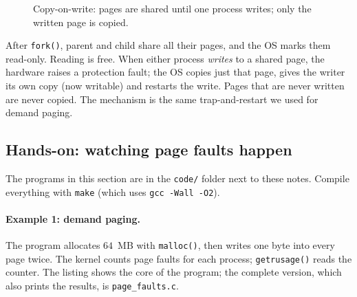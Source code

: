 \documentclass[11pt,a4paper]{article}
\newcommand{\cmd}[1]{\texttt{#1}}
\begin{document}
\begin{figure}[H]
\centering
{}
\caption{Copy-on-write: pages are shared until one process writes; only the written page is copied.}
\end{figure}

After \cmd{fork()}, parent and child share all their pages, and the OS marks them read-only. Reading is free. When either process \emph{writes} to a shared page, the hardware raises a protection fault; the OS copies just that page, gives the writer its own copy (now writable) and restarts the write. Pages that are never written are never copied. The mechanism is the same trap-and-restart we used for demand paging.

\subsection{Hands-on: watching page faults happen}

The programs in this section are in the \texttt{code/} folder next to these notes. Compile everything with \cmd{make} (which uses \cmd{gcc -Wall -O2}).

\paragraph{Example 1: demand paging.} The program allocates $64$~MB with \cmd{malloc()}, then writes one byte into every page twice. The kernel counts page faults for each process; \cmd{getrusage()} reads the counter. The listing shows the core of the program; the complete version, which also prints the results, is \cmd{page\_faults.c}.
\end{document}
